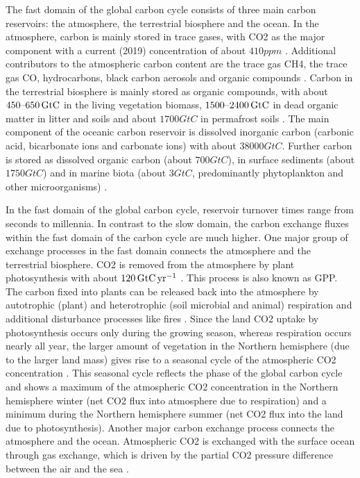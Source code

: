 The fast domain of the global carbon cycle consists of three main carbon
reservoirs: the atmosphere, the terrestrial biosphere and the ocean. In the
atmosphere, carbon is mainly stored in trace gases, with \ac{CO2} as the major
component with a current (2019) concentration of about $410 \unit{ppm}$
\autocite{Friedlingstein2019}. Additional contributors to the atmospheric
carbon content are the trace gas \ac{CH4}, the trace gas \ac{CO}, hydrocarbons,
black carbon aerosols and organic compounds \autocite{Ciais2013}. Carbon in the
terrestrial biosphere is mainly stored as organic compounds, with about
$\range{450}{650} \unit{GtC}$ in the living vegetation biomass,
$\range{1500}{2400} \unit{GtC}$ in dead organic matter in litter and soils and
about $1700 \unit{GtC}$ in permafrost soils \autocite{Ciais2013}. The main
component of the oceanic carbon reservoir is dissolved inorganic carbon
(carbonic acid, bicarbonate ions and carbonate ions) with about $38000
\unit{GtC}$. Further carbon is stored as dissolved organic carbon (about $700
\unit{GtC}$), in surface sediments (about $1750 \unit{GtC}$) and in marine
biota (about $3 \unit{GtC}$, predominantly phytoplankton and other
microorganisms) \autocite{Ciais2013, Friedlingstein2019}.

In the fast domain of the global carbon cycle, reservoir turnover times range
from seconds to millennia. In contrast to the slow domain, the carbon exchange
fluxes within the fast domain of the carbon cycle are much higher. One major
group of exchange processes in the fast domain connects the atmosphere and the
terrestrial biosphere. \ac{CO2} is removed from the atmosphere by plant
photosynthesis with about $120 \unit{\GtCyr{}}$ \autocite{Ciais2013}. This
process is also known as \ac{GPP}. The carbon fixed into plants can be released
back into the atmosphere by autotrophic (plant) and heterotrophic (soil
microbial and animal) respiration and additional disturbance processes like
fires \autocite{Ciais2013}. Since the land \ac{CO2} uptake by photosynthesis
occurs only during the growing season, whereas respiration occurs nearly all
year, the larger amount of vegetation in the Northern hemisphere (due to the
larger land mass) gives rise to a seasonal cycle of the atmospheric \ac{CO2}
concentration \autocite{Keeling1995}. This seasonal cycle reflects the phase of
the global carbon cycle and shows a maximum of the atmospheric \ac{CO2}
concentration in the Northern hemisphere winter (net \ac{CO2} flux into
atmosphere due to respiration) and a minimum during the Northern hemisphere
summer (net \ac{CO2} flux into the land due to photosynthesis). Another major
carbon exchange process connects the atmosphere and the ocean. Atmospheric
\ac{CO2} is exchanged with the surface ocean through gas exchange, which is
driven by the partial \ac{CO2} pressure difference between the air and the sea
\autocite{Ciais2013}.


